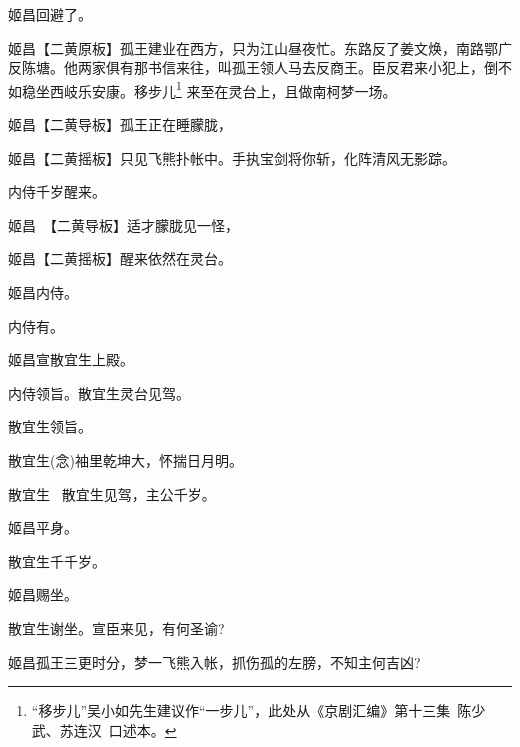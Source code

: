 {姬昌\hspace{30pt}回避了。

\setlength{\hangindent}{56pt}   %
{姬昌\hspace{30pt}【{\akai 二黄原板}】孤王建业在西方，只为江山昼夜忙。东路反了姜文焕，南路鄂广反陈塘。他两家俱有那书信来往，叫孤王领人马去反商王。臣反君来小犯上，倒不如稳坐西岐乐安康。移步儿\footnote{``移步儿''吴小如先生建议作``一步儿''，此处从《京剧汇编》第十三集~陈少武、苏连汉~口述本。}%
来至在灵台上，且做南柯梦一场。}

姬昌\hspace{30pt}【{\akai 二黄导板}】孤王正在睡朦胧，

	姬昌\hspace{30pt}【{\akai 二黄摇板}】只见飞熊扑帐中。手执宝剑将你斩，化阵清风无影踪。

内侍\hspace{30pt}千岁醒来。

姬昌\hspace{30pt}~【{\akai 二黄导板}】适才朦胧见一怪，

	姬昌\hspace{30pt}【{\akai 二黄摇板}】醒来依然在灵台。

姬昌\hspace{30pt}内侍。

内侍\hspace{30pt}有。

姬昌\hspace{30pt}宣散宜生上殿。

内侍\hspace{30pt}领旨。散宜生灵台见驾。

散宜生\hspace{20pt}领旨。

散宜生\hspace{20pt}({\akai 念})袖里乾坤大，怀揣日月明。

散宜生 \hspace{20pt}~散宜生见驾，主公千岁。

姬昌\hspace{30pt}平身。

散宜生\hspace{20pt}千千岁。

姬昌\hspace{30pt}赐坐。

散宜生\hspace{20pt}谢坐。宣臣来见，有何圣谕?

姬昌\hspace{30pt}孤王三更时分，梦一飞熊入帐，抓伤孤的左膀，不知主何吉凶?

}
